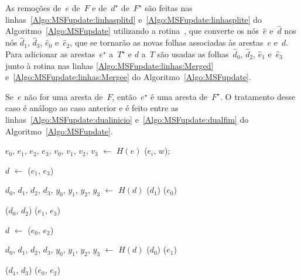 As remoções de~$e$ de~$F$ e de~$d^\star$ de~$F^\star$ são feitas nas linhas~\ref{Algo:MSFupdate:linhasplitd} e~\ref{Algo:MSFupdate:linhasplite} do Algoritmo~\ref{Algo:MSFupdate} utilizando a rotina~\LCOSplit{}, que converte os nós~$\hat e$ e~$\hat d$ nos nós $\hat d_1$, $\hat d_3$, $\hat e_0$ e~$\hat e_2$, que se tornarão as novas folhas associadas às arestas~$e$ e~$d$.
Para adicionar as arestas~$e^\star$ a~$T^\star$ e $d$ a~$T$ são usadas as folhas~$\hat d_0$, $\hat d_2$, $\hat e_1$ e~$\hat e_3$ junto à rotina \LCOMerge{} nas linhas \ref{Algo:MSFupdate:linhas:Merged} e~\ref{Algo:MSFupdate:linhas:Mergee} do Algoritmo~\ref{Algo:MSFupdate}.

Se~$e$ não for uma aresta de~$F$, então~$e^\star$ é uma aresta de~$F^\star$.
O tratamento desse caso é análogo ao caso anterior e é feito entre as linhas~\ref{Algo:MSFupdate:dualinicio} e~\ref{Algo:MSFupdate:dualfim} do Algoritmo~\ref{Algo:MSFupdate}.

\begin{algorithm}[htb]
\caption{\MSFupdate($G$, $e$, $w$)}
\label{Algo:MSFupdate}
\begin{algorithmic}[1]
\State $e_0$, $e_1$, $e_2$, $e_3$, $v_0$, $v_1$, $v_2$, $v_3$ $\gets$ $H(e)$
\State  \LCOAddCost($e_i$, $w$);
\EndFor

\State $d$ $\gets$ \LCOMin($e_1$, $e_3$)\label{Algo:MSFupdate:linhamin}

\State $d_0$, $d_1$, $d_2$, $d_3$, $y_0$, $y_1$, $y_2$, $y_3$ $\gets$ $H(d)$
\State \LCOSplit($d_1$)\label{Algo:MSFupdate:linhasplitd}
\State \LCOSplit($e_0$)\label{Algo:MSFupdate:linhasplite}


\State \LCOMerge($d_0$, $d_2$)\label{Algo:MSFupdate:linhas:Merged}
\State \LCOMerge($e_1$, $e_3$)\label{Algo:MSFupdate:linhas:Mergee}

\EndIf

\Else
\State $d$ $\gets$ \LCOMax($e_0$, $e_2$)\label{Algo:MSFupdate:dualinicio}

\State $d_0$, $d_1$, $d_2$, $d_3$, $y_0$, $y_1$, $y_2$, $y_3$ $\gets$ $H(d)$
\State \LCOSplit($d_0$)
\State \LCOSplit($e_1$)

\State \LCOMerge($d_1$, $d_3$)
\State \LCOMerge($e_0$, $e_2$)

\EndIf
\EndIf\label{Algo:MSFupdate:dualfim}
\end{algorithmic}
\end{algorithm}


